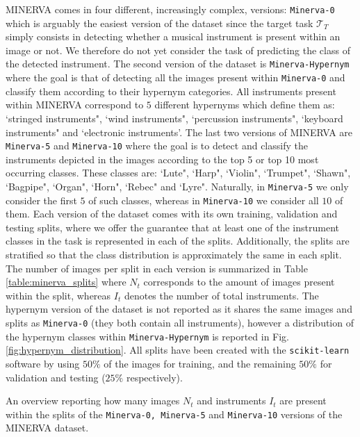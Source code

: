 MINERVA comes in four different, increasingly complex, versions: \texttt{Minerva-0} which is arguably the easiest version of the dataset since the target task $\mathcal{T}_T$ simply consists in detecting whether a musical instrument is present within an image or not. We therefore do not yet consider the task of predicting the class of the detected instrument. The second version of the dataset is \texttt{Minerva-Hypernym} where the goal is that of detecting all the images present within \texttt{Minerva-0} and classify them according to their hypernym categories. All instruments present within MINERVA correspond to $5$ different hypernyms which define them as: `stringed instruments", `wind instruments", `percussion instruments", `keyboard instruments" and `electronic instruments'. The last two versions of MINERVA are \texttt{Minerva-5} and \texttt{Minerva-10} where the goal is to detect and classify the instruments depicted in the images according to the top 5 or top 10 most occurring classes. These classes are: `Lute", `Harp", `Violin", `Trumpet", `Shawn", `Bagpipe", `Organ", `Horn", `Rebec" and `Lyre". Naturally, in \texttt{Minerva-5} we only consider the first $5$ of such classes, whereas in \texttt{Minerva-10} we consider all $10$ of them. Each version of the dataset comes with its own training, validation and testing splits, where we offer the guarantee that at least one of the instrument classes in the task is represented in each of the splits. Additionally, the splits are stratified so that the class distribution is approximately the same in each split. The number of images per split in each version is summarized in Table \ref{table:minerva_splits} where $N_t$ corresponds to the amount of images present within the split, whereas $I_t$ denotes the number of total instruments. The hypernym version of the dataset is not reported as it shares the same images and splits as \texttt{Minerva-0} (they both contain all instruments), however a distribution of the hypernym classes within \texttt{Minerva-Hypernym} is reported in Fig. \ref{fig:hypernym_distribution}. All splits have been created with the \texttt{scikit-learn} software \cite{pedregosa2011scikit} by using $50\%$ of the images for training, and the remaining $50\%$ for validation and testing ($25\%$ respectively). 

\begin{table}

\caption{An overview reporting how many images $N_t$ and instruments $I_t$ are present within the splits of the \texttt{Minerva-0, Minerva-5} and \texttt{Minerva-10} versions of the MINERVA dataset.}
\label{table:minerva_splits}
\end{table}

